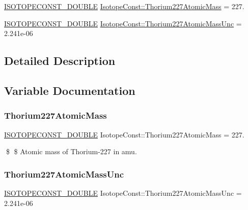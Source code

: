\begin{DoxyCompactItemize}
\item 
\mbox{\hyperlink{group___isotope_const-_macros_ga8f45a7272ce02c0b4c65c44636ed719a}{I\+S\+O\+T\+O\+P\+E\+C\+O\+N\+S\+T\+\_\+\+D\+O\+U\+B\+LE}} \mbox{\hyperlink{group___isotope_const-_thorium-_th227_ga2a024a19b11f25f95a118e7c2d449481}{Isotope\+Const\+::\+Thorium227\+Atomic\+Mass}} = 227.
\item 
\mbox{\hyperlink{group___isotope_const-_macros_ga8f45a7272ce02c0b4c65c44636ed719a}{I\+S\+O\+T\+O\+P\+E\+C\+O\+N\+S\+T\+\_\+\+D\+O\+U\+B\+LE}} \mbox{\hyperlink{group___isotope_const-_thorium-_th227_ga2fdd0b8b0b84e24979e7f214a036361e}{Isotope\+Const\+::\+Thorium227\+Atomic\+Mass\+Unc}} = 2.\+241e-\/06
\end{DoxyCompactItemize}


\subsection{Detailed Description}


\subsection{Variable Documentation}
\mbox{\label{group___isotope_const-_thorium-_th227_ga2a024a19b11f25f95a118e7c2d449481}} 
\subsubsection{\texorpdfstring{Thorium227\+Atomic\+Mass}{Thorium227AtomicMass}}
{\footnotesize\ttfamily \mbox{\hyperlink{group___isotope_const-_macros_ga8f45a7272ce02c0b4c65c44636ed719a}{I\+S\+O\+T\+O\+P\+E\+C\+O\+N\+S\+T\+\_\+\+D\+O\+U\+B\+LE}} Isotope\+Const\+::\+Thorium227\+Atomic\+Mass = 227.}

\$ \$ Atomic mass of Thorium-\/227 in amu. \mbox{\label{group___isotope_const-_thorium-_th227_ga2fdd0b8b0b84e24979e7f214a036361e}} 
\subsubsection{\texorpdfstring{Thorium227\+Atomic\+Mass\+Unc}{Thorium227AtomicMassUnc}}
{\footnotesize\ttfamily \mbox{\hyperlink{group___isotope_const-_macros_ga8f45a7272ce02c0b4c65c44636ed719a}{I\+S\+O\+T\+O\+P\+E\+C\+O\+N\+S\+T\+\_\+\+D\+O\+U\+B\+LE}} Isotope\+Const\+::\+Thorium227\+Atomic\+Mass\+Unc = 2.\+241e-\/06}

